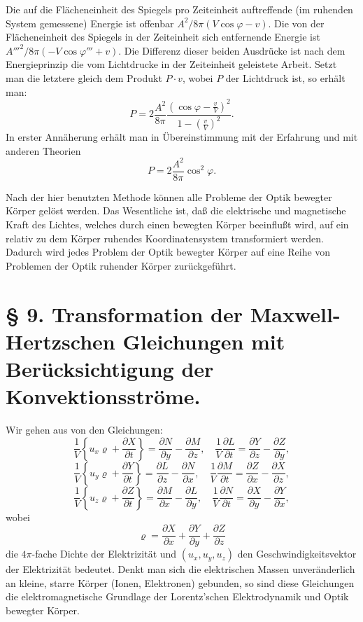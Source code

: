 \documentclass[17pt]{webarticle}       %
\begin{document}
Die auf die Flächeneinheit des Spiegels pro Zeiteinheit auftreffende (im ruhenden System gemessene) Energie ist offenbar \( A^2 / 8\pi (V \cos \varphi - v) \). Die von der Flächeneinheit des Spiegels in der Zeiteinheit sich entfernende Energie ist \( A'''^2 / 8\pi (-V \cos \varphi''' + v) \). Die Differenz dieser beiden Ausdrücke ist nach dem Energieprinzip die vom Lichtdrucke in der Zeiteinheit geleistete Arbeit. Setzt man die letztere gleich dem Produkt \( P \cdot v \), wobei \( P \) der Lichtdruck ist, so erhält man:
\[
P = 2 \frac{A^2}{8\pi} \frac{( \cos \varphi - \frac{v}{V} )^2}{1 - \left( \frac{v}{V} \right)^2}.
\]
In erster Annäherung erhält man in Übereinstimmung mit der Erfahrung und mit anderen Theorien
\[
P = 2 \frac{A^2}{8\pi} \cos^2 \varphi.
\]

Nach der hier benutzten Methode können alle Probleme der Optik bewegter Körper gelöst werden. Das Wesentliche ist, daß die elektrische und magnetische Kraft des Lichtes, welches durch einen bewegten Körper beeinflußt wird, auf ein relativ zu dem Körper ruhendes Koordinatensystem transformiert werden. Dadurch wird jedes Problem der Optik bewegter Körper auf eine Reihe von Problemen der Optik ruhender Körper zurückgeführt.

\section*{§ 9. Transformation der Maxwell-Hertzschen Gleichungen mit Berücksichtigung der Konvektionsströme.}

Wir gehen aus von den Gleichungen:
\[
\frac{1}{V} \left\{ u_x \varrho + \frac{\partial X}{\partial t} \right\} = \frac{\partial N}{\partial y} - \frac{\partial M}{\partial z}, \quad \frac{1}{V} \frac{\partial L}{\partial t} = \frac{\partial Y}{\partial z} - \frac{\partial Z}{\partial y},
\]
\[
\frac{1}{V} \left\{ u_y \varrho + \frac{\partial Y}{\partial t} \right\} = \frac{\partial L}{\partial z} - \frac{\partial N}{\partial x}, \quad \frac{1}{V} \frac{\partial M}{\partial t} = \frac{\partial Z}{\partial x} - \frac{\partial X}{\partial z},
\]
\[
\frac{1}{V} \left\{ u_z \varrho + \frac{\partial Z}{\partial t} \right\} = \frac{\partial M}{\partial x} - \frac{\partial L}{\partial y}, \quad \frac{1}{V} \frac{\partial N}{\partial t} = \frac{\partial X}{\partial y} - \frac{\partial Y}{\partial x},
\]
wobei
\[
\varrho = \frac{\partial X}{\partial x} + \frac{\partial Y}{\partial y} + \frac{\partial Z}{\partial z}
\]
die \( 4 \pi \)-fache Dichte der Elektrizität und \( (u_x, u_y, u_z) \) den Geschwindigkeitsvektor der Elektrizität bedeutet. Denkt man sich die elektrischen Massen unveränderlich an kleine, starre Körper (Ionen, Elektronen) gebunden, so sind diese Gleichungen die elektromagnetische Grundlage der Lorentz'schen Elektrodynamik und Optik bewegter Körper.
\end{document}
